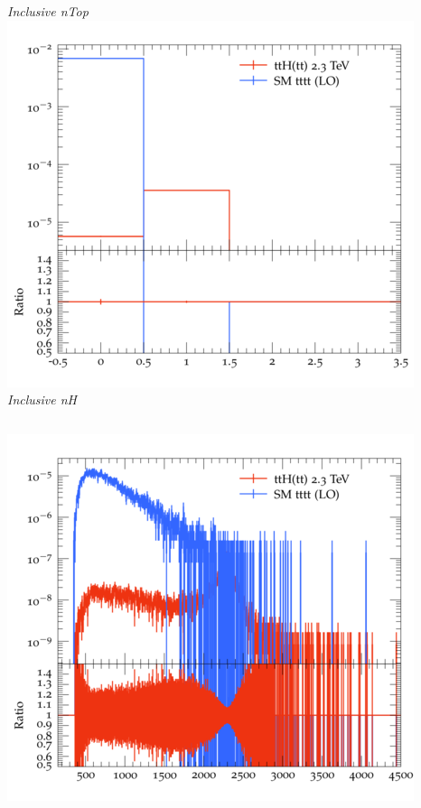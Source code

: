 \documentclass{beamer}
\begin{document}
\begin{frame}
\begin{columns}
\textit{\small Inclusive nTop}
\includegraphics[width=\textwidth]{../plots/ttH_2300/tttt_ttH/Inclusive_nH.png}\\
\textit{\small Inclusive nH}
\end{columns}
\begin{columns}
\includegraphics[width=\textwidth]{../plots/ttH_2300/tttt_ttH/Inclusive_InvM_ttbar12.png}\\

\end{columns}
\end{frame}
\end{document}
